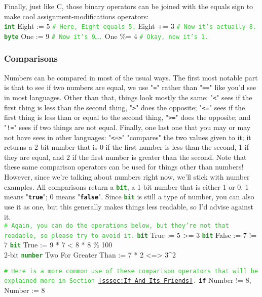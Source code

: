 \documentclass{article}
\newcommand{\sssecl}[1]{\subsubsection{#1}\label{sssec:#1}}
\newcommand{\codecomment}[1]{\texttt{\textcolor{LimeGreen}{#1}}}
\newcommand{\commentline}[1]{\codecomment{\# #1}}
\newcommand{\type}[1]{\texttt{\textcolor{ForestGreen}{\textbf{#1}}}}
\newcommand{\common}[1]{\texttt{\textcolor{Mulberry}{\textbf{#1}}}}
\newenvironment{code}[0]
{\ttfamily{}				%
\setlength\parindent{0cm}	%
~\\}
{\setlength\parindent{1cm}
~\\}
\begin{document}
\indent Finally, just like C, those binary operators can be joined with the equals sign to make cool assignment-modifications operators:
\begin{code}
\type{int} Eight := 5	\commentline{Here, Eight equals 5.}
Eight += 3	\commentline{Now it's actually 8.}
\\
\type{byte} One := 9	\commentline{Now it's 9\ldots.}
One \%= 4	\commentline{Okay, now it's 1.}
\end{code}

\sssecl{Comparisons}
\indent Numbers can be compared in most of the usual ways. The first most notable part is that to see if two numbers are equal, we use "\texttt{=}" rather than "\texttt{==}" like you'd see in most languages. Other than that, things look mostly the same: "\texttt{<}" sees if the first thing is less than the second thing, "\texttt{>}" does the opposite; "\texttt{<=}" sees if the first thing is less than or equal to the second thing, "\texttt{>=}" does the opposite; and "\texttt{!=}" sees if two things are not equal. Finally, one last one that you may or may not have sees in other languages: "\texttt{<=>}" "compares" the two values given to it; it returns a 2-bit number that is 0 if the first number is less than the second, 1 if they are equal, and 2 if the first number is greater than the second. Note that these same comparison operators can be used for things other than numbers! However, since we're talking about numbers right now, we'll stick with number examples.
\indent All comparisons return a \type{bit}, a 1-bit number that is either 1 or 0. 1 means "\common{true}"; 0 means "\common{false}". Since \type{bit} is still a type of number, you can also use it as one, but this generally makes things less readable, so I'd advise against it.
\begin{code}
\commentline{Again, you can do the operations below, but they're not that readable, so please try to avoid it.}
\type{bit} True := 5 >= 3
\type{bit} False := 7 != 7
\type{bit} True := 9 * 7 < 8 * 8 \% 100\\
2-bit \type{number} Two For Greater Than := 7 * 2 <=> 3^2

\commentline{Here is a more common use of these comparison operators that will be explained more in Section \ref{sssec:If And Its Friends}.}
\common{if} Number != 8,
	Number := 8
\end{code}
\end{document}
